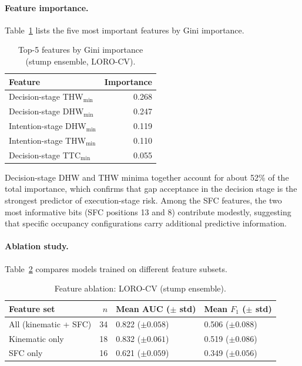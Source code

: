 \documentclass[12pt,a4paper,twoside,openright]{report}
\begin{document}
    \paragraph{Feature importance.}
    Table~\ref{tab:feature-importance} lists the five most important features by Gini importance.

    \begin{table}[H]
        \centering
        \caption{Top-5 features by Gini importance (stump ensemble, LORO-CV).}
        \label{tab:feature-importance}
        \begin{tabular}{@{}lr@{}}
            \toprule
            Feature & Importance \\
            \midrule
            Decision-stage THW$_{\min}$  & 0.268 \\
            Decision-stage DHW$_{\min}$  & 0.247 \\
            Intention-stage DHW$_{\min}$ & 0.119 \\
            Intention-stage THW$_{\min}$ & 0.110 \\
            Decision-stage TTC$_{\min}$  & 0.055 \\
            \bottomrule
        \end{tabular}
    \end{table}

    Decision-stage DHW and THW minima together account for about 52\% of the total importance, which confirms that gap acceptance in the decision stage is the strongest predictor of execution-stage risk. Among the SFC features, the two most informative bits (SFC positions 13 and 8) contribute modestly, suggesting that specific occupancy configurations carry additional predictive information.

    \paragraph{Ablation study.}
    Table~\ref{tab:ablation} compares models trained on different feature subsets.

    \begin{table}[H]
        \centering
        \caption{Feature ablation: LORO-CV (stump ensemble).}
        \label{tab:ablation}
        \begin{tabular}{@{}lrll@{}}
            \toprule
            Feature set & $n$ & Mean AUC ($\pm$ std) & Mean $F_1$ ($\pm$ std) \\
            \midrule
            All (kinematic + SFC) & 34 & 0.822 ($\pm 0.058$) & 0.506 ($\pm 0.088$) \\
            Kinematic only        & 18 & 0.832 ($\pm 0.061$) & 0.519 ($\pm 0.086$) \\
            SFC only              & 16 & 0.621 ($\pm 0.059$) & 0.349 ($\pm 0.056$) \\
            \bottomrule
        \end{tabular}
    \end{table}
\end{document}
